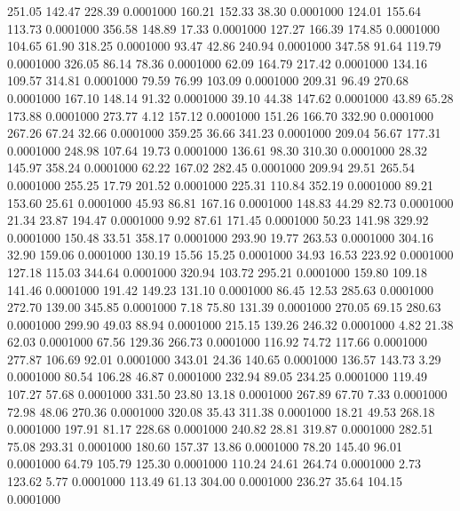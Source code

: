 251.05  142.47  228.39   0.0001000
 160.21  152.33   38.30   0.0001000
 124.01  155.64  113.73   0.0001000
 356.58  148.89   17.33   0.0001000
 127.27  166.39  174.85   0.0001000
 104.65   61.90  318.25   0.0001000
  93.47   42.86  240.94   0.0001000
 347.58   91.64  119.79   0.0001000
 326.05   86.14   78.36   0.0001000
  62.09  164.79  217.42   0.0001000
 134.16  109.57  314.81   0.0001000
  79.59   76.99  103.09   0.0001000
 209.31   96.49  270.68   0.0001000
 167.10  148.14   91.32   0.0001000
  39.10   44.38  147.62   0.0001000
  43.89   65.28  173.88   0.0001000
 273.77    4.12  157.12   0.0001000
 151.26  166.70  332.90   0.0001000
 267.26   67.24   32.66   0.0001000
 359.25   36.66  341.23   0.0001000
 209.04   56.67  177.31   0.0001000
 248.98  107.64   19.73   0.0001000
 136.61   98.30  310.30   0.0001000
  28.32  145.97  358.24   0.0001000
  62.22  167.02  282.45   0.0001000
 209.94   29.51  265.54   0.0001000
 255.25   17.79  201.52   0.0001000
 225.31  110.84  352.19   0.0001000
  89.21  153.60   25.61   0.0001000
  45.93   86.81  167.16   0.0001000
 148.83   44.29   82.73   0.0001000
  21.34   23.87  194.47   0.0001000
   9.92   87.61  171.45   0.0001000
  50.23  141.98  329.92   0.0001000
 150.48   33.51  358.17   0.0001000
 293.90   19.77  263.53   0.0001000
 304.16   32.90  159.06   0.0001000
 130.19   15.56   15.25   0.0001000
  34.93   16.53  223.92   0.0001000
 127.18  115.03  344.64   0.0001000
 320.94  103.72  295.21   0.0001000
 159.80  109.18  141.46   0.0001000
 191.42  149.23  131.10   0.0001000
  86.45   12.53  285.63   0.0001000
 272.70  139.00  345.85   0.0001000
   7.18   75.80  131.39   0.0001000
 270.05   69.15  280.63   0.0001000
 299.90   49.03   88.94   0.0001000
 215.15  139.26  246.32   0.0001000
   4.82   21.38   62.03   0.0001000
  67.56  129.36  266.73   0.0001000
 116.92   74.72  117.66   0.0001000
 277.87  106.69   92.01   0.0001000
 343.01   24.36  140.65   0.0001000
 136.57  143.73    3.29   0.0001000
  80.54  106.28   46.87   0.0001000
 232.94   89.05  234.25   0.0001000
 119.49  107.27   57.68   0.0001000
 331.50   23.80   13.18   0.0001000
 267.89   67.70    7.33   0.0001000
  72.98   48.06  270.36   0.0001000
 320.08   35.43  311.38   0.0001000
  18.21   49.53  268.18   0.0001000
 197.91   81.17  228.68   0.0001000
 240.82   28.81  319.87   0.0001000
 282.51   75.08  293.31   0.0001000
 180.60  157.37   13.86   0.0001000
  78.20  145.40   96.01   0.0001000
  64.79  105.79  125.30   0.0001000
 110.24   24.61  264.74   0.0001000
   2.73  123.62    5.77   0.0001000
 113.49   61.13  304.00   0.0001000
 236.27   35.64  104.15   0.0001000
